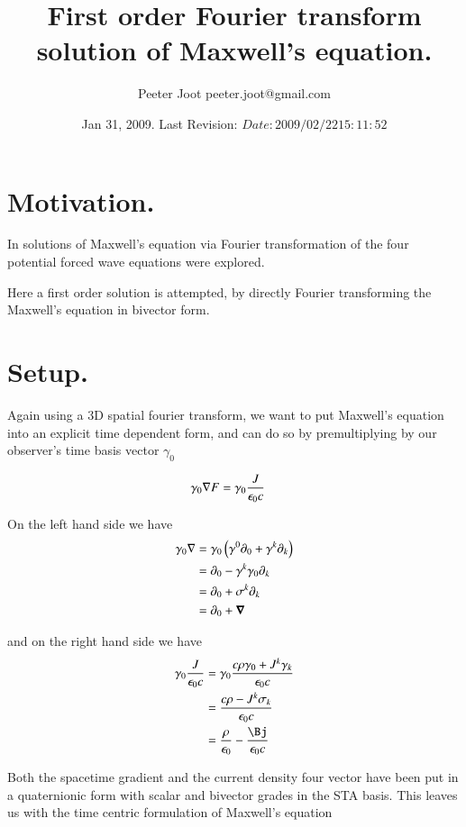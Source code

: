 \documentclass{article}
\title{ First order Fourier transform solution of Maxwell's equation. }
\author{Peeter Joot \quad peeter.joot@gmail.com}
\date{ Jan 31, 2009.  Last Revision: $Date: 2009/02/22 15:11:52 $ }
\begin{document}
\maketitle{}

\tableofcontents

\section{ Motivation. }

In \cite{PJfourierMaxwellSecondOrder} solutions of Maxwell's equation
via Fourier transformation of the four potential forced wave equations were
explored.

Here a first order solution is attempted, by directly Fourier transforming
the Maxwell's equation in bivector form.

\section{ Setup. }

Again using a 3D spatial fourier transform, we want to put Maxwell's equation into an explicit time dependent form, and can do so by
premultiplying by our observer's time basis vector $\gamma_0$

\begin{align*}
\gamma_0 \nabla F &= \gamma_0 \frac{J }{\epsilon_0 c}
\end{align*}

On the left hand side we have
\begin{align*}
\gamma_0 \nabla 
&= \gamma_0 \left( \gamma^0 \partial_0 + \gamma^k \partial_k \right) \\
&= \partial_0 - \gamma^k \gamma_0 \partial_k \\
&= \partial_0 + \sigma^k \partial_k \\
&= \partial_0 + \boldsymbol{\nabla} \\
\end{align*}

and on the right hand side we have
\begin{align*}
\gamma_0 \frac{J }{\epsilon_0 c}
&= \gamma_0 \frac{c \rho \gamma_0 + J^k \gamma_k }{\epsilon_0 c} \\
&= \frac{c \rho - J^k \sigma_k }{\epsilon_0 c} \\
&= \frac{\rho}{\epsilon_0} - \frac{\Bj}{\epsilon_0 c} \\
\end{align*}

Both the spacetime gradient and the current density four vector have been put in a quaternionic form with scalar and bivector grades in the 
STA basis.  This leaves us with the time centric formulation of Maxwell's equation
\end{document}
